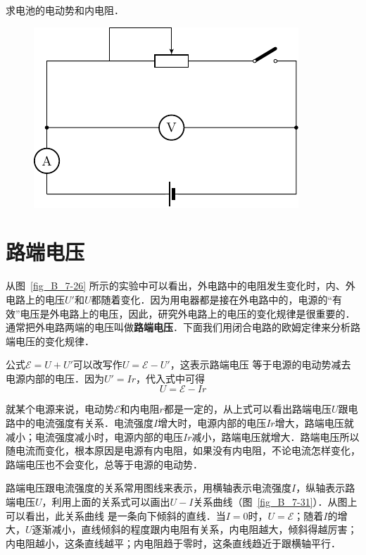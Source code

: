 \begin{enumerate}
    求电池的电动势和内电阻．
    \begin{figure}[htbp]
        \centering
        \includegraphics{fig/B/7-30.pdf}
        \caption{}\label{fig_B_7-30}
    \end{figure}
\end{enumerate}




  

\section{路端电压}
从图~\ref{fig_B_7-26} 所示的实验中可以看出，外电路中的电阻发生变化时，内、外电路上的电压$U'$和$U$都随着变化．因为用电器都是接在外电路中的，电源的“有效”电压是外电路上的电压，因此，研究外电路上的电压的变化规律是很重要的．
通常把外电路两端的电压叫做\textbf{路端电压}．下面我们用闭合电路的欧姆定律来分析路端电压的变化规律．

公式$\mathcal{E}=U+U'$可以改写作$U=\mathcal{E}-U'$，这表示路端电压
等于电源的电动势减去电源内部的电压．因为$U'=Ir$，代入式中可得
\[U=\mathcal{E}-Ir\]

就某个电源来说，电动势$\mathcal{E}$和内电阻$r$都是一定的，从上式可以看出路端电压$U$跟电路中的电流强度有关系．电流强度$I$增大时，电源内部的电压$Ir$增大，路端电压就减小；电流强度减小时，电源内部的电压$Ir$减小，路端电压就增大．路端电压所以随电流而变化，根本原因是电源有内电阻，如果没有内电阻，不论电流怎样变化，路端电压也不会变化，总等于电源的电动势．


路端电压跟电流强度的关系常用图线来表示，用横轴表示电流强度$I$，纵轴表示路端电压$U$，利用上面的关系式可以画出$U-I$关系曲线（图~\ref{fig_B_7-31}）．从图上可以看出，此关系曲线
是一条向下倾斜的直线．当$I=0$时，$U=\mathcal{E}$；随着$I$的增大，$U$逐渐减小，直线倾斜的程度跟内电阻有关系，内电阻越大，倾斜得越厉害；内电阻越小，这条直线越平；内电阻趋于零时，这条直线趋近于跟横轴平行．

